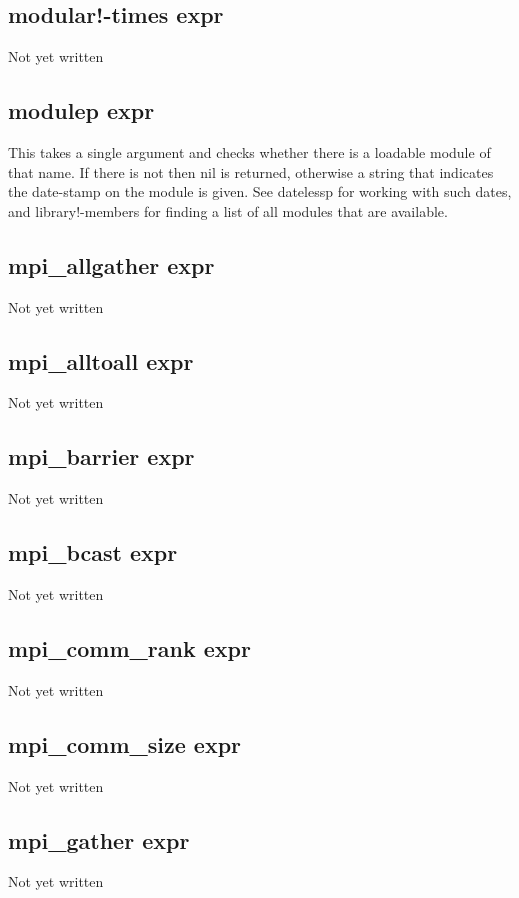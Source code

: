 \documentclass[a4paper,11pt]{article}
\begin{document}
\subsection{\ttfamily modular!-times expr}
Not yet written

\subsection{\ttfamily modulep expr}
This takes a single argument and checks whether there is a loadable module
of that name. If there is not then {\ttfamily nil} is returned, otherwise a
string that indicates the date-stamp on the module is given. See
{\ttfamily datelessp} for working with such dates, and {\ttfamily
library!-members} for finding a list of all modules that are available.

\subsection{\ttfamily mpi\_allgather expr}
Not yet written

\subsection{\ttfamily mpi\_alltoall expr}
Not yet written

\subsection{\ttfamily mpi\_barrier expr}
Not yet written

\subsection{\ttfamily mpi\_bcast expr}
Not yet written

\subsection{\ttfamily mpi\_comm\_rank expr}
Not yet written

\subsection{\ttfamily mpi\_comm\_size expr}
Not yet written

\subsection{\ttfamily mpi\_gather expr}
Not yet written
\end{document}
